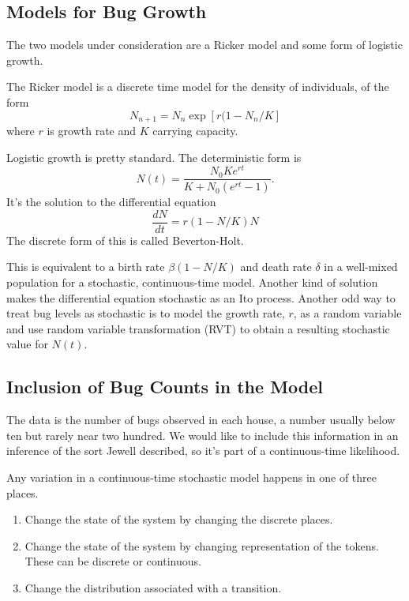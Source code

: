 \documentclass{article}
\begin{document}
\subsection{Models for Bug Growth}
The two models under consideration are a Ricker model and some form
of logistic growth.

The Ricker model is a discrete time model for the density of individuals,
of the form
\begin{equation}
  N_{n+1}=N_n\exp\left[r(1-N_n/K\right]
\end{equation}
where $r$ is growth rate and $K$ carrying capacity.

Logistic growth is pretty standard. The deterministic form is
\begin{equation}
N(t)=\frac{N_0Ke^{rt}}{K+N_0(e^{rt}-1)}.
\end{equation}
It's the solution to the differential equation
\begin{equation}
  \frac{dN}{dt}=r\left(1-N/K\right)N
\end{equation}
The discrete form of this is called Beverton-Holt.

This is equivalent to a birth rate $\beta(1-N/K)$ and death rate $\delta$
in a well-mixed population for a stochastic, continuous-time model.
Another kind of solution makes the differential equation stochastic
as an Ito process. Another odd way to treat bug levels as stochastic
is to model the growth rate, $r$, as a random variable and 
use random variable transformation (RVT) to obtain a resulting
stochastic value for $N(t)$.

\subsection{Inclusion of Bug Counts in the Model}
The data is the number of bugs observed in each house, a number
usually below ten but rarely near two hundred. We would like to include
this information in an inference of the sort Jewell described, so
it's part of a continuous-time likelihood.

Any variation in a continuous-time stochastic model happens in
one of three places.
\begin{enumerate}
  \item Change the state of the system by changing the discrete
        places.
  \item Change the state of the system by changing representation
        of the tokens. These can be discrete or continuous.
  \item Change the distribution associated with a transition.
\end{enumerate}
\end{document}
